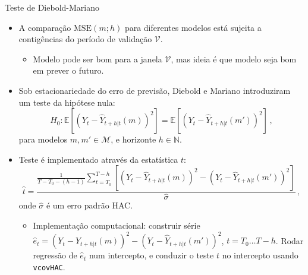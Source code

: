 \documentclass[11pt]{beamer}
\begin{document}
\begin{frame}{Teste de Diebold-Mariano}
	\begin{itemize}
		\item A comparação $\text{MSE}(m;h)$ para diferentes modelos está sujeita a contigências do período de validação $\mathcal{V}$.
		\begin{itemize}
			\item Modelo pode ser bom para a janela $\mathcal{V}$, mas ideia é que modelo seja bom em prever o futuro.
		\end{itemize}
		\item Sob estacionariedade do erro de previsão, Diebold e Mariano introduziram um teste da hipótese nula:
		$$H_0: \mathbb{E}[(Y_t - \hat{Y}_{t+h|t}(m))^2] = \mathbb{E}[(Y_t - \hat{Y}_{t+h|t}(m'))^2] \, ,$$
		para modelos $m,m' \in \mathcal{M}$, e horizonte $h \in \mathbb{N}$.
		\item Teste é implementado através da estatística $t$:
		$$\hat t = \frac{\frac{1}{T-T_0-(h-1)}\sum_{t=T_0}^{T-h} [(Y_t - \hat{Y}_{t+h|t}(m))^2 -(Y_t - \hat{Y}_{t+h|t}(m'))^2 ]}{\hat \sigma}\,,$$
		onde $\hat \sigma$ é um erro padrão HAC.
		\begin{itemize}
			\item Implementação computacional: construir série $\hat{e}_t = (Y_t - \hat{Y}_{t+h|t}(m))^2 -(Y_t - \hat{Y}_{t+h|t}(m'))^2$, $t = T_0\ldots T-h$. Rodar regressão de $\hat{e}_t$ num intercepto, e conduzir o teste $t$ no intercepto usando \texttt{vcovHAC}.
		\end{itemize}  
	\end{itemize}
\end{frame}
\end{document}
